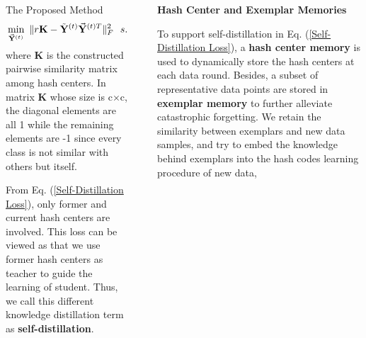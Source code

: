 \documentclass[final]{beamer}
\newlength{\sepwidth}
\newlength{\colwidth}
\newcommand{\separatorcolumn}{\begin{column}{\sepwidth}\end{column}}
\begin{document}
\begin{frame}[t]
\begin{columns}[t]
\begin{column}{\colwidth}
\begin{block}{The Proposed Method}
					\begin{equation}
						\begin{aligned}
							& \min_{\vec{\mathbf{Y}}^{(t)}}
							\  \| r\mathbf{K}-\tilde{\mathbf{Y}}^{(t)}  \vec{\mathbf{Y}}^{(t)T} \|_{F}^{2}\ \  s.t. \  \vec{\mathbf{Y}}^{(t)} \in   \{-1, 1\}^{c \times r},
						\end{aligned}
						\label{Self-Distillation Loss}
						\vspace{-1mm}
					\end{equation}
					where $\mathbf{K}$ is the constructed pairwise similarity matrix among hash centers. In matrix $\mathbf{K}$ whose size is c$\times$c, the diagonal elements are all 1 while the remaining elements are -1 since every class is not similar with others but itself.
					
					From  Eq. (\ref{Self-Distillation Loss}), only former and current hash centers are involved. This loss can be viewed as that we use former hash centers as teacher to guide the learning of student.  Thus, we call this different knowledge distillation term as \textbf{self-distillation}.

					
				\end{block}
				
			\end{column}
			
			\separatorcolumn
			
			\begin{column}{\colwidth}
				
					\textbf{Hash Center and Exemplar Memories}
					
					To support self-distillation in Eq. (\ref{Self-Distillation Loss}), a \textbf{hash center memory} is used to dynamically store the hash centers at each data round. Besides, a subset of representative data points are stored in \textbf{exemplar memory} to further alleviate catastrophic forgetting. We retain the similarity between exemplars and new data samples, and try to embed the knowledge behind exemplars into the hash codes learning procedure of new data,
					

\end{column}
\end{columns}
\end{frame}
\end{document}
